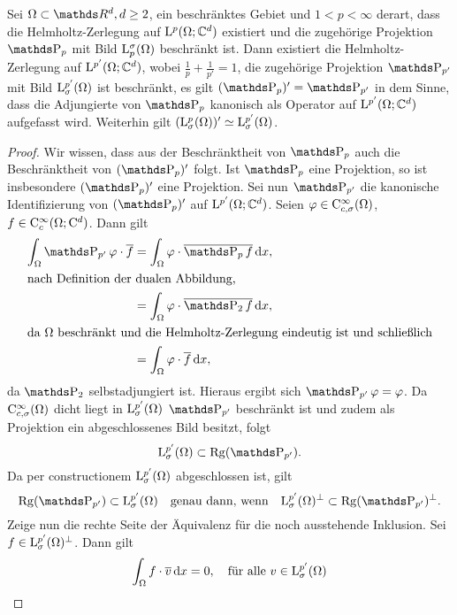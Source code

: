 \begin{prop}
  Sei $\Omega \subset \R^d, d\geq 2$, ein beschränktes Gebiet und $1< p< \infty$ derart, dass die Helmholtz-Zerlegung auf $\mathrm{L}^p(\Omega; \mathbb{C}^d)$ existiert und die zugehörige Projektion $\PP_p$ mit Bild $\mathrm{L}_p^\sigma(\Omega)$ beschränkt ist.
  Dann existiert die Helmholtz-Zerlegung auf $\mathrm{L}^{p'}(\Omega; \mathbb{C}^d)$, wobei $\frac{1}{p} + \frac{1}{p'} = 1$, die zugehörige Projektion $\PP_{p'}$ mit Bild $\mathrm{L}^{p'}_\sigma(\Omega)$ ist beschränkt, es gilt $(\PP_p)' = \PP_{p'}$ in dem Sinne, dass die Adjungierte von $\PP_p$ kanonisch als Operator auf $\mathrm{L}^{p'}(\Omega; \mathbb{C}^d)$ aufgefasst wird.
  Weiterhin gilt $(\mathrm{L}_\sigma^p(\Omega))' \simeq \mathrm{L}_\sigma^{p'}(\Omega)$.
\end{prop}

\begin{proof}
  Wir wissen, dass aus der Beschränktheit von $\PP_p$ auch die Beschränktheit von $(\PP_p)'$ folgt.
  Ist $\PP_p$ eine Projektion, so ist insbesondere $(\PP_p)'$ eine Projektion.
  Sei nun $\PP_{p'}$ die kanonische Identifizierung von $(\PP_p)'$ auf $\mathrm{L}^{p'}(\Omega; \mathbb{C}^d)$.
  Seien $\varphi \in \mathrm{C}_{c, \sigma}^\infty(\Omega)$, $f \in \mathrm{C}_c^\infty(\Omega; \mathrm{C}^d)$.
  Dann gilt
  \begin{align*}
    \int_\Omega \PP_{p'}\varphi \cdot \overline f 
    &= \int_\Omega \varphi \cdot \overline{\PP_p f} \d x,  \\
    \intertext{nach Definition der dualen Abbildung,}
    &= \int_\Omega \varphi \cdot \overline{\PP_2 f} \d x, \\
    \intertext{da $\Omega$ beschränkt und die Helmholtz-Zerlegung eindeutig ist und schließlich}
    &= \int_\Omega \varphi \cdot \overline{f} \d x,
  \end{align*}
  da $\PP_2$ selbstadjungiert ist.
  Hieraus ergibt sich $\PP_{p'} \varphi = \varphi$.
  Da $\mathrm{C}_{c, \sigma}^\infty(\Omega)$ dicht liegt in $\mathrm{L}^{p'}_\sigma(\Omega)$ $\PP_{p'}$ beschränkt ist und zudem als Projektion ein abgeschlossenes Bild besitzt, folgt
  $$
  \Ell^{p'}_\sigma(\Omega) \subset \Rg(\PP_{p'}).
  $$
  Da per constructionem $\mathrm{L}_\sigma^{p'}(\Omega)$ abgeschlossen ist, gilt
  $$
  \Rg(\PP_{p'}) \subset \Ell_\sigma^{p'}(\Omega)\quad \text{genau dann, wenn}\quad \Ell_\sigma^{p'}(\Omega)^\perp \subset \Rg(\PP_{p'})^\perp.
  $$
  Zeige nun die rechte Seite der Äquivalenz für die noch ausstehende Inklusion.
  Sei $f \in \mathrm{L}^{p'}_\sigma(\Omega)^\perp$.
  Dann gilt
  $$
  \int_\Omega f \cdot \overline v \, {\operatorname{d}\!{x}} = 0, \quad\text{für alle } v \in \mathrm{L}_\sigma^{p'}(\Omega)
$$
\end{proof}
